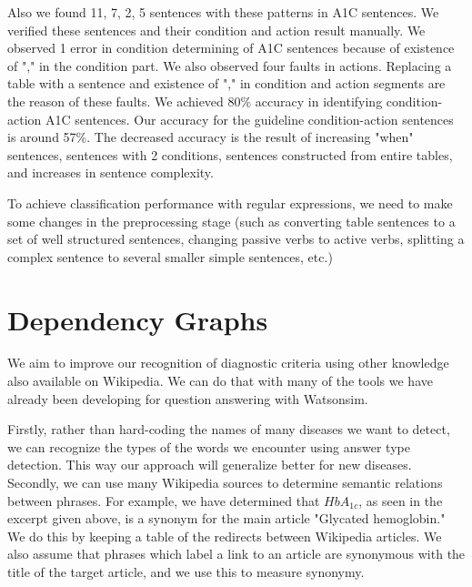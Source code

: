 \documentclass[12pt,letterpaper]{article}
\begin{document}
Also we found 11, 7, 2, 5 sentences with these patterns in A1C sentences. We verified these sentences and their condition and action result manually. We observed 1 error in condition determining of A1C sentences because of existence of "," in the condition part. We also observed four faults in actions. Replacing a table with a sentence and existence of "," in condition and action segments are the reason of these faults. We achieved 80\% accuracy in identifying condition-action A1C sentences. Our accuracy for the guideline condition-action sentences is around 57\%. The decreased accuracy is the result of increasing "when" sentences, sentences with 2 conditions, sentences constructed from entire tables, and increases in sentence complexity.

To achieve classification performance with regular expressions, we need to make some changes in the preprocessing stage (such as converting table sentences to a set of well structured sentences, changing passive verbs to active verbs, splitting a complex sentence to several smaller simple sentences, etc.)

\section{Dependency Graphs}
We aim to improve our recognition of diagnostic criteria using other knowledge also available on Wikipedia. We can do that with many of the tools we have already been developing for question answering with Watsonsim.

Firstly, rather than hard-coding the names of many diseases we want to detect, we can recognize the types of the words we encounter using answer type detection. This way our approach will generalize better for new diseases.
Secondly, we can use many Wikipedia sources to determine semantic relations between phrases. For example, we have determined that $HbA_{1c}$, as seen in the excerpt given above, is a synonym for the main article "Glycated hemoglobin." We do this by keeping a table of the redirects between Wikipedia articles. We also assume that phrases which label a link to an article are synonymous with the title of the target article, and we use this to measure synonymy.
\end{document}
